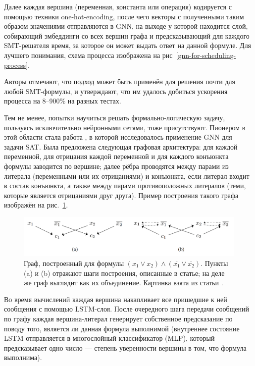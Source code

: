 Далее каждая вершина (переменная, константа или операция) кодируется с помощью техники one-hot-encoding, после чего векторы с полученными таким образом значениями отправляются в GNN, на выходе у которой находится слой, собирающий эмбеддинги со всех вершин графа и предсказывающий для каждого SMT-решателя время, за которое он может выдать ответ на данной формуле. Для лучшего понимания, схема процесса изображена на рис~\ref{gnn-for-scheduling-process}.

Авторы отмечают, что подход может быть применён для решения почти для любой SMT-формулы, и утверждают, что им удалось добиться ускорения процесса на 8--900\% на разных тестах.


Тем не менее, попытки научиться решать формально-логическую задачу, пользуясь исключительно нейронными сетями, тоже присутствуют. Пионером в этой области стала работа \cite{neurosat-paper}, в которой исследовалось применение GNN для задачи SAT. Была предложена следующая графовая архитектура: для каждой переменной, для отрицания каждой переменной и для каждого конъюнкта формулы заводится по вершине; далее рёбра проводятся между парами из литерала (переменными или их отрицаниями) и конъюнкта, если литерал входит в состав конъюнкта, а также между парами противоположных литералов (теми, которые является отрицаниями друг друга). Пример построения такого графа изображён на рис.~\ref{neurosat-mpnn}.

\begin{figure}[ht]
\begin{center}
    \includegraphics[scale=0.25]{./assets/neurosat-mpnn.png}
    \caption{\label{neurosat-mpnn} Граф, построенный для формулы $(x_1 \vee x_2) \wedge (\overline{x_1} \vee \overline{x_2})$. Пункты (a) и (b) отражают шаги построения, описанные в статье; на деле же граф выглядит как их объединение. Картинка взята из статьи \cite{neurosat-paper}.}
\end{center}
\end{figure}

Во время вычислений каждая вершина накапливает все пришедшие к ней сообщения с помощью LSTM-слоя. После очередного шага передачи сообщений по графу каждая вершина-литерал генерирует собственное предсказание по поводу того, является ли данная формула выполнимой (внутреннее состояние LSTM отправляется в многослойный классификатор (MLP), который предсказывает одно число --- степень уверенности вершины в том, что формула выполнима).

